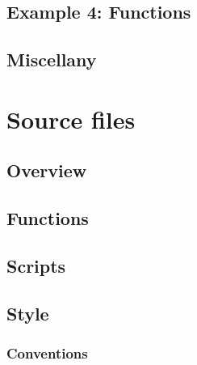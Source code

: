 \documentclass[10pt,letterpaper]{article}
\begin{document}
\subsection{Example 4: Functions} %
\label{sub:example_4_functions}


\subsection{Miscellany} %
\label{sub:miscellany}





\section{Source files} %
\label{sec:source_files}

\subsection{Overview} %
\label{sub:overview_s}


\subsection{Functions} %
\label{sub:functions}


\subsection{Scripts} %
\label{sub:scripts}


\subsection{Style} %
\label{sub:style}

\subsubsection{Conventions} %
\label{ssub:conventions}

\end{document}
